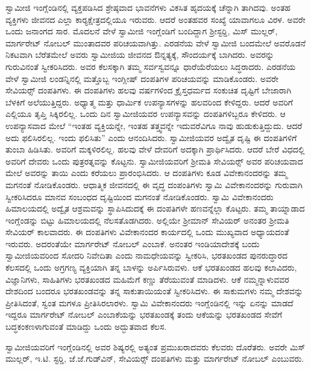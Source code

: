  ಸ್ವಾಮೀಜಿ ಇಂಗ್ಲೆಂಡಿನಲ್ಲಿ ವ್ಯಕ್ತಪಡಿಸಿದ ಶ್ರೇಷ್ಠವಾದ ಭಾವನೆಗಳು ವಿಕಸಿತ ಹೃದಯಕ್ಕೆ ಚೆನ್ನಾಗಿ ತಾಗಿದವು. ಅಂತಹ ವ್ಯಕ್ತಿಗಳು ಜೀವನದ ಎಲ್ಲಾ ಕಾರ‍್ಯಕ್ಷೇತ್ರದಲ್ಲಿಯೂ ಇರುವರು. ಆದರೆ ಅಂತಹವರ ಸಂಖ್ಯೆ ಯಾವಾಗಲೂ ವಿರಳ. ಅವರೇ ಒಂದು ಜನಾಂಗದ ಸಾರ. ಮೊದಲನೆ ವೇಳೆ ಸ್ವಾಮೀಜಿ ಇಂಗ್ಲೆಂಡಿಗೆ ಬಂದಿದ್ದಾಗ ಶ‍್ರೀಸ್ಟರ‍್ಡಿ, ಮಿಸ್ ಮುಲ್ಲರ್, ಮಾರ್ಗರೇಟ್ ನೋಬಲ್ ಮುಂತಾದವರ ಪರಿಚಯವಾಗಿತ್ತು. ಎರಡನೆಯ ವೇಳೆ ಸ್ವಾಮೀಜಿ ಬಂದಮೇಲೆ ಅವರೊಡನೆ ನಿಕಟವಾಗಿ ಬೆರೆತಮೇಲೆ ಅವರು ಸ್ವಾಮೀಜಿಯ ಜೀವನದ ಔನ್ನತ್ಯಕ್ಕೆ, ಸೌಂದರ್ಯಕ್ಕೆ ಬಾಗಿದರು. ಅವರನ್ನು ಗುರುವಿನಂತೆ ಸ್ವೀಕರಿಸಿದರು. ಅವರ ಕೆಲಸಕ್ಕಾಗಿ ತಮ್ಮ ಸರ್ವಸ್ವವನ್ನೂ ಧಾರೆಯೆರೆಯಲು ಸಿದ್ಧರಾದರು. ಎರಡನೆಯ ವೇಳೆ ಸ್ವಾಮೀಜಿ ಲಂಡನ್ನಿನಲ್ಲಿ ಮತ್ತೊಬ್ಬ ಇಂಗ್ಲೀಷ್ ದಂಪತಿಗಳ ಪರಿಚಯವನ್ನು ಮಾಡಿಕೊಂಡರು. ಅವರೇ ಸೇವಿಯರ್ಸ್‍‍ ದಂಪತಿಗಳು. ಈ ದಂಪತಿಗಳು ಹಲವು ವರ್ಷಗಳಿಂದ ಕ್ರೈಸ್ತಧರ್ಮದ ಸಂಕುಚಿತ ದೃಷ್ಟಿಗೆ ಬೇಜಾರಾಗಿ ಬೆಳಕಿಗೆ ಅಲೆಯುತ್ತಿದ್ದರು. ಅಧ್ಯಾತ್ಮ ಮತ್ತು ಧಾರ್ಮಿಕ ಉಪನ್ಯಾಸಗಳನ್ನು ಹಲವರಿಂದ ಕೇಳಿದ್ದರು. ಆದರೆ ಅವರಿಗೆ ಎಲ್ಲಿಯೂ ತೃಪ್ತಿ ಸಿಕ್ಕಿರಲಿಲ್ಲ. ಒಂದು ದಿನ ಸ್ವಾಮೀಜಿಯವರ ಉಪನ್ಯಾಸವನ್ನು ದಂಪತಿಗಳಿಬ್ಬರೂ ಕೇಳಿದರು. ಆ ಉಪನ್ಯಾಸವಾದ ಮೇಲೆ “ಇಂತಹ ವ್ಯಕ್ತಿಯನ್ನೇ, ಇಂತಹ ತತ್ತ್ವವನ್ನೇ ಇದುವರೆವಿಗೂ ನಾವು ಹುಡುಕುತ್ತಿದ್ದುದು. ಆದರೆ ಅದು ಫಲಿಸಿರಲಿಲ್ಲ. ಇಂದು ಫಲಿಸಿತು” ಎಂದು ಆನಂದಿಸಿದರು. ಸ್ವಾಮೀಜಿಯವರ ಅದ್ವೈತ ದೃಷ್ಟಿ ಈ ದಂಪತಿಗಳಿಗೆ ತುಂಬಾ ಹಿಡಿಸಿತು. ಅವರಿಗೆ ಮಕ್ಕಳಿರಲಿಲ್ಲ. ಹಲವು ವೇಳೆ ದೇವರಿಗೆ ಅದಕ್ಕಾಗಿ ಪ್ರಾರ್ಥಿಸಿದರು. ಆದರೆ ಬೇರೆ ವಿಧದಲ್ಲಿ ಅವರಿಗೆ ದೇವರು ಒಂದು ಪುತ್ರರತ್ನವನ್ನು ಕೊಟ್ಟನು. ಸ್ವಾಮೀಜಿಯವರಿಗೆ ಶ‍್ರೀಮತಿ ಸೇವಿಯರ್ಸ್‍‍ ಅವರ ಪರಿಚಯವಾದ ಮೇಲೆ ಅವರನ್ನು ತಾಯಿ ಎಂದು ಕರೆಯಲು ಪ್ರಾರಂಭಿಸಿದರು. ಆ ದಂಪತಿಗಳು ಕೂಡ ವಿವೇಕಾನಂದರನ್ನು ತಮ್ಮ ಮಗನಂತೆ ನೋಡಿಕೊಂಡರು. ಆಧಾತ್ಮಿಕ ಜೀವನದಲ್ಲಿ ಈ ವೃದ್ಧ ದಂಪಂತಿಗಳು ಸ್ವಾಮಿ ವಿವೇಕಾನಂದರನ್ನು ಗುರುವಾಗಿ ಸ್ವೀಕರಿಸಿದರೂ ಮಾನವ ಸಂಬಂಧದ ದೃಷ್ಟಿಯಿಂದ ಮಗನಂತೆ ನೋಡಿಕೊಂಡರು. ಸ್ವಾಮಿ ವಿವೇಕಾನಂದರು ಹಿಮಾಲಯದಲ್ಲಿ ಅದ್ವೈತ ಆಶ್ರಮವನ್ನು ಸ್ಥಾಪಿಸಿದುದಕ್ಕೆ ಈ ದಂಪತಿಗಳೇ ಹಣವನ್ನೆಲ್ಲಾ ಕೊಟ್ಟರು. ತಮ್ಮ ತಾಯ್ನಾಡಾದ ಇಂಗ್ಲೆಂಡನ್ನು ಬಿಟ್ಟು ಹಿಮಾಲಯದಲ್ಲಿ ನೆಲಸತೊಡಗಿದರು. ಅಲ್ಲಿಯೇ ಶ‍್ರೀಮಾನ್ ಸೇವಿಯರ್ ಅನಂತರ ಶ‍್ರೀಮತಿ ಸೇವಿಯರ್ ಕಾಲವಾದರು. ಈ ದಂಪತಿಗಳು ವಿವೇಕಾನಂದರ ಕಾರ್ಯದಲ್ಲಿ ಒಂದು ಮುಖ್ಯವಾದ ಅಧ್ಯಾಯದಂತೆ ಇರುವರು. ಅದರಂತೆಯೇ ಮಾರ್ಗರೇಟ್ ನೋಬಲ್ ಎಂಬಾಕೆ. ಅನಂತರ ಇಂಡಿಯಾದೇಶಕ್ಕೆ ಬಂದು ಸ್ವಾಮೀಜಿಯವರಿಂದ ಸೋದರಿ ನಿವೇದಿತಾ ಎಂದು ನಾಮಧೇಯವನ್ನು ಸ್ವೀಕರಿಸಿ, ಭರತಖಂಡದ ಪುನರುದ್ಧಾರದ ಕೆಲಸದಲ್ಲಿ ಒಂದು ಅಗ್ರಗಣ್ಯ ವ್ಯಕ್ತಿಯಾಗಿ ತನ್ನ ಬಾಳನ್ನು ಅರ್ಪಿಸಿರುವಳು. ಆಕೆ ಭರತಖಂಡದ ಹಲವು ಕಲಾವಿದರು, ವಿಜ್ಞಾನಿಗಳು, ಸಾಹಿತಿಗಳು ಭರತಖಂಡದ ಮಹಿಮೆಗೆ ಕಣ್ಣು ತೆರೆಯುವಂತೆ ಮಾಡಿದಳು. ಆಕೆ ನಮ್ಮನ್ನಾಳುವವರ ದೇಶದಿಂದ ಬಂದರೂ ಭರತಖಂಡವನ್ನು ತನ್ನ ಸಾಕುತಾಯಿಯಂತೆ ಸ್ವೀಕರಿಸಿದಳು. ಈ ಸಾಕುಮಗಳು ನಮ್ಮ ದೇಶವನ್ನು ಪ್ರೀತಿಸಿದಂತೆ, ಸ್ವಂತ ಮಗಳೂ ಪ್ರೀತಿಸಿರಲಾರಳು. ಸ್ವಾಮಿ ವಿವೇಕಾನಂದರು ಇಂಗ್ಲೆಂಡಿನಲ್ಲಿ ಇನ್ನು ಏನನ್ನು ಮಾಡದೆ ಇದ್ದರೂ ಮಾರ್ಗರೇಟ್ ನೋಬಲ್ ಎಂಬಾಕೆಯನ್ನು ಭರತಖಂಡಕ್ಕೆ ತಂದು ಆಕೆಯನ್ನು ಭರತಖಂಡದ ಸೇವೆಗೆ ಬದ್ಧಕಂಕಣಳಾಗುವಂತೆ ಮಾಡಿದ್ದು ಒಂದು ಅದ್ಭುತವಾದ ಕೆಲಸ. 

 ಸ್ವಾಮೀಜಿಯವರಿಗೆ ಇಂಗ್ಲೆಂಡಿನಲ್ಲಿ ಅವರ ಶಿಷ್ಯರಲ್ಲಿ ಅತ್ಯಂತ ಪ್ರಮುಖರಾದವರು ಕೆಲವರು ದೊರೆತರು. ಅವರೇ ಮಿಸ್ ಮುಲ್ಲರ್, ಇ.ಟಿ. ಸ್ಟರ‍್ಡಿ, ಜೆ.ಜೆ.ಗುಡ್‍ವಿನ್, ಸೇವಿಯರ್ಸ್‍‍ ದಂಪತಿಗಳು ಮತ್ತು ಮಾರ್ಗರೇಟ್ ನೋಬಲ್ ಎಂಬುವರು. 

